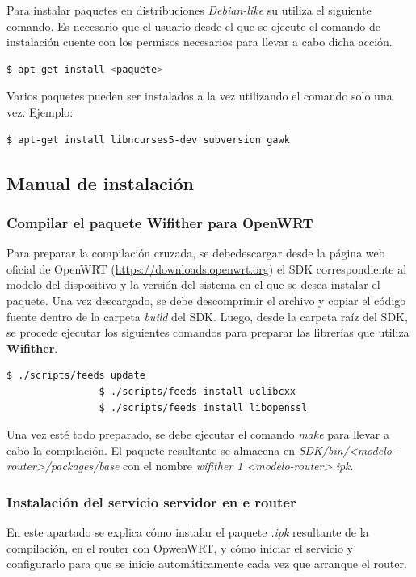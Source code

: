\documentclass[12pt]{article}
\begin{document}
        Para instalar paquetes en distribuciones \textit{Debian-like} su utiliza el siguiente comando.
        Es necesario que el usuario desde el que se ejecute el comando de instalación cuente con los permisos necesarios para llevar a cabo dicha acción.

        \begin{lstlisting}[language=bash]
            $ apt-get install <paquete>
        \end{lstlisting}

        Varios paquetes pueden ser instalados a la vez utilizando el comando solo una vez.
        Ejemplo:

        \begin{lstlisting}[language=bash]
            $ apt-get install libncurses5-dev subversion gawk
        \end{lstlisting}

    \subsection{Manual de instalación}
        \subsubsection{Compilar el paquete Wifither para OpenWRT}
            Para preparar la compilación cruzada, se debedescargar desde la página web oficial de OpenWRT (\url{https://downloads.openwrt.org}) el SDK correspondiente al modelo del dispositivo y la versión del sistema en el que se desea instalar el paquete. Una vez descargado, se debe descomprimir el archivo y copiar el código fuente dentro de la carpeta \textit{build} del SDK. Luego, desde la carpeta raíz del SDK, se procede ejecutar los siguientes comandos para preparar las librerías que utiliza \textbf{Wifither}.

            \begin{lstlisting}[language=bash]
                $ ./scripts/feeds update
                $ ./scripts/feeds install uclibcxx
                $ ./scripts/feeds install libopenssl
            \end{lstlisting}

            Una vez esté todo preparado, se debe ejecutar el comando \textit{make} para llevar a cabo la compilación. El paquete resultante se almacena en \textit{SDK/bin/<modelo-router>/packages/base} con el nombre \textit{wifither 1 <modelo-router>.ipk}.


        \subsubsection{Instalación del servicio servidor en e router}
            En este apartado se explica cómo instalar el paquete \textit{.ipk} resultante de la compilación, en el router con OpwenWRT, y cómo iniciar el servicio y configurarlo para que se inicie automáticamente cada vez que arranque el router.
\end{document}

